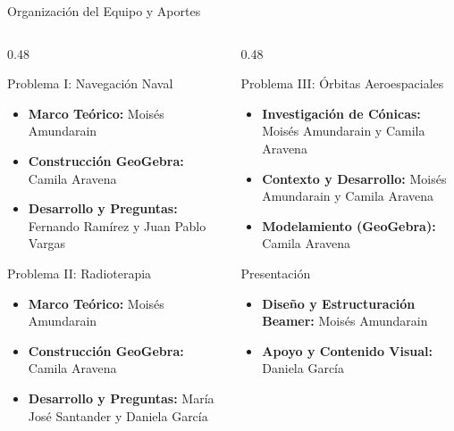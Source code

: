 \documentclass[aspectratio=169]{beamer}
\begin{document}
\begin{frame}{Organización del Equipo y Aportes}
  \begin{columns}[T]
    \begin{column}{0.48\textwidth}
      \begin{block}{Problema I: Navegación Naval}
        \scriptsize
        \begin{itemize}
          \item \textbf{Marco Teórico:} Moisés Amundarain
          \item \textbf{Construcción GeoGebra:} Camila Aravena
          \item \textbf{Desarrollo y Preguntas:} Fernando Ramírez y Juan Pablo Vargas
        \end{itemize}
      \end{block}
      \vspace{0.1cm}
      \begin{block}{Problema II: Radioterapia}
        \scriptsize
        \begin{itemize}
          \item \textbf{Marco Teórico:} Moisés Amundarain
          \item \textbf{Construcción GeoGebra:} Camila Aravena
          \item \textbf{Desarrollo y Preguntas:} María José Santander y Daniela García
        \end{itemize}
      \end{block}
    \end{column}
    \begin{column}{0.48\textwidth}
      \begin{block}{Problema III: Órbitas Aeroespaciales}
        \scriptsize
        \begin{itemize}
          \item \textbf{Investigación de Cónicas:} Moisés Amundarain y Camila Aravena
          \item \textbf{Contexto y Desarrollo:} Moisés Amundarain y Camila Aravena
          \item \textbf{Modelamiento (GeoGebra):} Camila Aravena
        \end{itemize}
      \end{block}
      \vspace{0.1cm}
      \begin{block}{Presentación}
        \scriptsize
        \begin{itemize}
          \item \textbf{Diseño y Estructuración Beamer:} Moisés Amundarain
          \item \textbf{Apoyo y Contenido Visual:} Daniela García
        \end{itemize}
      \end{block}
    \end{column}
  \end{columns}
\end{frame}
\end{document}
